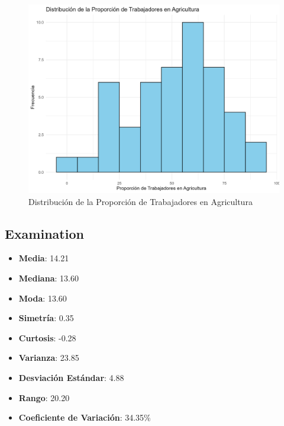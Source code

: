 \documentclass{article}
\begin{document}
\begin{figure}[h!]
\centering
\includegraphics[width=\textwidth]{Histogramas/histogram_agriculture.png}
\caption{Distribución de la Proporción de Trabajadores en Agricultura}
\end{figure}

\subsection{Examination}
\begin{itemize}
    \item \textbf{Media}: 14.21
    \item \textbf{Mediana}: 13.60
    \item \textbf{Moda}: 13.60
    \item \textbf{Simetría}: 0.35
    \item \textbf{Curtosis}: -0.28
    \item \textbf{Varianza}: 23.85
    \item \textbf{Desviación Estándar}: 4.88
    \item \textbf{Rango}: 20.20
    \item \textbf{Coeficiente de Variación}: 34.35\%
\end{itemize}
\end{document}
